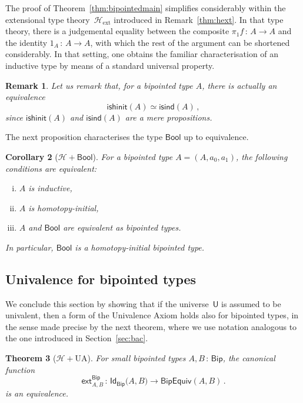\documentclass[10pt,a4paper,oneside,reqno]{amsart}
\numberwithin{equation}{section}
\theoremstyle{mythm}
\newtheorem{theorem}{Theorem}[subsection]
\newtheorem{corollary}[theorem]{Corollary}
\theoremstyle{mydef}
\theoremstyle{myrmk}
\newtheorem{remark}[theorem]{Remark}
\newcommand{\co}{\,{:}\,}
\newcommand{\Hint}{\mathcal{H}}
\newcommand{\Hext}{\mathcal{H}_{\mathrm{ext}}}
\newcommand{\isbipind}{\mathsf{isind}}
\newcommand{\isbiphinit}{\mathsf{ishinit}}
\newcommand{\ext}{\mathsf{ext}}
\newcommand{\Bool}{\mathsf{Bool}}
\newcommand{\Id}{\mathsf{Id}}
\newcommand{\U}{\mathsf{U}}
\newcommand{\Bip}{\mathsf{Bip}}
\newcommand{\BipEquiv}{\mathsf{BipEquiv}}
\begin{document}
The proof of Theorem~\ref{thm:bipointedmain} simplifies considerably within the extensional
type theory~$\Hext$ introduced in Remark~\ref{thm:hext}. In that type theory, 
there is a judgemental equality 
between the composite $\pi_1 f \co A \to A$ and the identity $1_A \co A \to A$, with which the
rest of the argument can be shortened considerably. In that setting, one obtains the familiar characterisation 
of an inductive type by means of a standard universal property.

\begin{remark} 
Let us remark that, for a bipointed type $A$, there is actually an equivalence  
\[
\isbiphinit(A) \simeq \isbipind(A) \, ,
\]
since $\isbiphinit(A)$ and $\isbipind(A)$ are a mere propositions. 
\end{remark} 

The next proposition characterises the
type $\Bool$ up to equivalence.



\begin{corollary}[$\Hint + \Bool$]  For a bipointed type $A = (A, a_0, a_1)$, the following 
conditions are equivalent:
\begin{enumerate}[(i)]
\item $A$ is inductive,
\item $A$ is homotopy-initial,
\item $A$ and $\Bool$ are equivalent as bipointed types.
\end{enumerate}
In particular, $\Bool$ is a homotopy-initial bipointed type.
\end{corollary}





\subsection{Univalence for bipointed types} \label{sec:unibip}
We conclude this section by showing that if the universe~$\U$ is assumed to be univalent, then a form of the Univalence Axiom holds also for bipointed types, in the sense made precise by the next theorem, where we
use notation analogous to the one introduced in Section~\ref{sec:bac}. 


\begin{theorem}[$\Hint + \mathrm{UA}$] \label{thm:bipunivalence}
For small bipointed types $A, B \co \Bip$, the  canonical function
\[ 
\ext^{\Bip}_{A,B} \co \Id_{\Bip} \big(A,B\big) \to  \BipEquiv(A,B) \, .
\] 
is an equivalence.
\end{theorem} 
\end{document}
